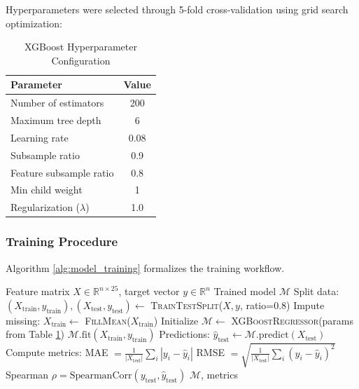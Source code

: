\documentclass[conference]{IEEEtran}
\begin{document}
Hyperparameters were selected through 5-fold cross-validation using grid search optimization:

\begin{table}[h]
\centering
\caption{XGBoost Hyperparameter Configuration}
\begin{tabular}{lc}
\toprule
\textbf{Parameter} & \textbf{Value} \\
\midrule
Number of estimators & 200 \\
Maximum tree depth & 6 \\
Learning rate & 0.08 \\
Subsample ratio & 0.9 \\
Feature subsample ratio & 0.8 \\
Min child weight & 1 \\
Regularization ($\lambda$) & 1.0 \\
\bottomrule
\end{tabular}
\label{tab:hyperparameters}
\end{table}

\subsubsection{Training Procedure}

Algorithm \ref{alg:model_training} formalizes the training workflow.

\begin{algorithm}
\caption{XGBoost Model Training}
\label{alg:model_training}
\begin{algorithmic}[1]
\REQUIRE Feature matrix $X \in \mathbb{R}^{n \times 25}$, target vector $y \in \mathbb{R}^n$
\ENSURE Trained model $\mathcal{M}$
\STATE Split data: $(X_{\text{train}}, y_{\text{train}}), (X_{\text{test}}, y_{\text{test}}) \leftarrow$ \textsc{TrainTestSplit}($X, y$, ratio=0.8)
\STATE Impute missing: $X_{\text{train}} \leftarrow$ \textsc{FillMean}($X_{\text{train}}$)
\STATE Initialize $\mathcal{M} \leftarrow$ \textsc{XGBoostRegressor}(params from Table \ref{tab:hyperparameters})
\STATE $\mathcal{M}.\text{fit}(X_{\text{train}}, y_{\text{train}})$
\STATE Predictions: $\hat{y}_{\text{test}} \leftarrow \mathcal{M}.\text{predict}(X_{\text{test}})$
\STATE Compute metrics:
\STATE \quad MAE $= \frac{1}{|X_{\text{test}}|} \sum_{i} |y_i - \hat{y}_i|$
\STATE \quad RMSE $= \sqrt{\frac{1}{|X_{\text{test}}|} \sum_{i} (y_i - \hat{y}_i)^2}$
\STATE \quad Spearman $\rho = \text{SpearmanCorr}(y_{\text{test}}, \hat{y}_{\text{test}})$
\RETURN $\mathcal{M}$, metrics
\end{algorithmic}
\end{algorithm}
\end{document}
